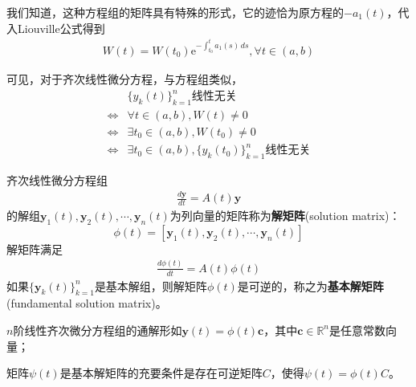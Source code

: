 我们知道，这种方程组的矩阵具有特殊的形式，它的迹恰为原方程的$-a_1(t)$，代入Liouville公式得到\begin{align*}
    W(t)=W(t_0)\mathrm{e}^{-\int_{t_0}^t a_1(s)\,ds},\forall t\in(a,b)
\end{align*}

可见，对于齐次线性微分方程，与方程组类似，\begin{align*}
    &\{y_k(t)\}_{k=1}^n\text{线性无关}\\
    \iff& \forall t\in(a,b),W(t)\neq 0\\
    \iff& \exists t_0\in(a,b),W(t_0)\neq 0\\
    \iff& \exists t_0\in(a,b),\{y_k(t_0)\}_{k=1}^n\text{线性无关}
\end{align*}

\begin{definition}[解矩阵]
    齐次线性微分方程组\begin{align*}
    \frac{d\mathbf{y}}{dt}=A(t)\mathbf{y}
    \end{align*}
    的解组$\mathbf{y}_1(t),\mathbf{y}_2(t),\cdots,\mathbf{y}_n(t)$为列向量的矩阵称为\textbf{解矩阵}(solution matrix)：
    \[\phi(t)=[\mathbf{y}_1(t),\mathbf{y}_2(t),\cdots,\mathbf{y}_n(t)]\]
    解矩阵满足\begin{align*}
        \frac{d\phi(t)}{dt}=A(t)\phi(t)
    \end{align*}
    如果$\{\mathbf{y}_k(t)\}_{k=1}^n$是基本解组，则解矩阵$\phi(t)$是可逆的，称之为\textbf{基本解矩阵}(fundamental solution matrix)。
\end{definition}
\begin{proposition}
    $n$阶线性齐次微分方程组的通解形如$\mathbf{y}(t)=\phi(t)\mathbf{c}$，其中$\mathbf{c}\in\mathbb{R}^n$是任意常数向量；

    矩阵$\psi(t)$是基本解矩阵的充要条件是存在可逆矩阵$C$，使得$\psi(t)=\phi(t)C$。
\end{proposition}


